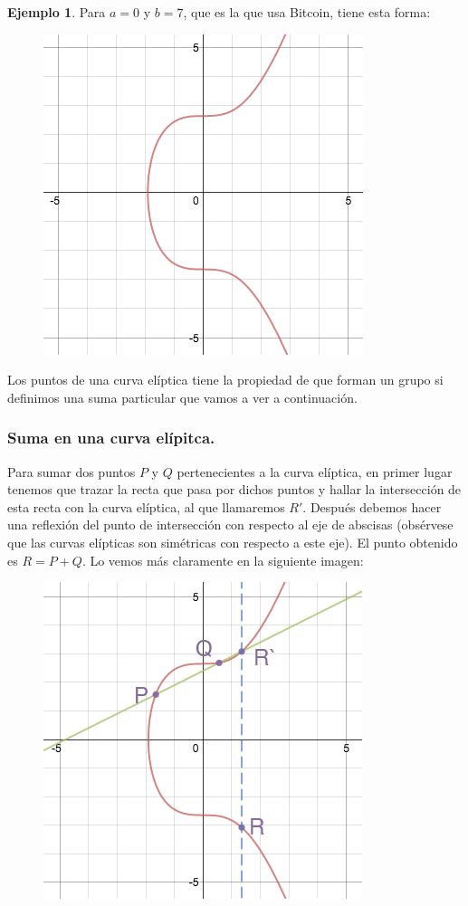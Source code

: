 \documentclass[twoside]{article}
\theoremstyle{definition}
\newtheorem{ej}[teorema]{Ejemplo}
\begin{document}
\begin{ej} Para $a=0$ y $b=7$, que es la que usa Bitcoin, tiene esta forma:
\begin{figure}[h!]
\includegraphics[scale=0.42]{ec}
\end{figure}
\end{ej}

Los puntos de una curva elíptica tiene la propiedad de que forman un grupo si definimos una suma particular que vamos a ver a continuación. 

\subsubsection{Suma en una curva elípitca.}

Para sumar dos puntos $P$ y $Q$ pertenecientes a la curva elíptica, en primer lugar tenemos que trazar la recta que pasa por dichos puntos y hallar la intersección de esta recta con la curva elíptica, al que llamaremos $R'$. Después debemos hacer una reflexión del punto de intersección con respecto al eje de abscisas (obsérvese que las curvas elípticas son simétricas con respecto a este eje). El punto obtenido es $R=P+Q$. Lo vemos más claramente en la siguiente imagen: 
\begin{figure}[h!]
\includegraphics[scale=0.4]{sumec}
\end{figure}
\end{document}
